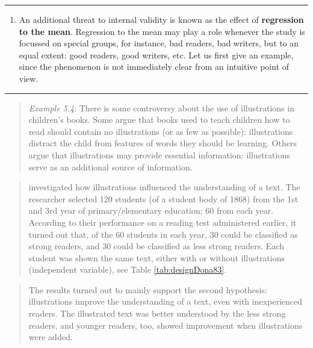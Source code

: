 \documentclass[
]{book}
\providecommand{\tightlist}{%
  \setlength{\itemsep}{0pt}\setlength{\parskip}{0pt}}
\begin{document}
\begin{center}\rule{0.5\linewidth}{0.5pt}\end{center}

\begin{enumerate}
\def\labelenumi{\arabic{enumi}.}
\setcounter{enumi}{3}
\tightlist
\item
  An additional threat to internal validity is known as the effect of \textbf{regression to the mean}. Regression to the mean may play a role whenever the study is focussed on special groups, for instance, bad readers, bad writers, but to an equal extent: good readers, good writers, etc. Let us first give an example, since the phenomenon is not immediately clear from an intuitive point of view.
\end{enumerate}

\begin{center}\rule{0.5\linewidth}{0.5pt}\end{center}

\begin{quote}
\emph{Example 5.4}: There is some controversy about the use of illustrations in children's books. Some argue that books used to teach children how to read should contain no illustrations (or as few as possible): illustrations distract the child from features of words they should be learning. Others argue that illustrations may provide essential information: illustrations serve as an additional source of information.
\end{quote}

\begin{quote}
\citet{Dona83} investigated how illustrations influenced the understanding of a text. The researcher selected 120 students (of a student body of 1868) from the 1st and 3rd year of primary/elementary education; 60 from each year. According to their performance on a reading test administered earlier, it turned out that, of the 60 students in each year, 30 could be classified as strong readers, and 30 could be classified as less strong readers. Each student was shown the same text, either with or without illustrations (independent variable), see Table \ref{tab:designDona83}.
\end{quote}

\begin{quote}
The results turned out to mainly support the second hypothesis: illustrations improve the understanding of a text, even with inexperienced readers. The illustrated text was better understood by the less strong readers, and younger readers, too, showed improvement when illustrations were added.
\end{quote}
\end{document}
